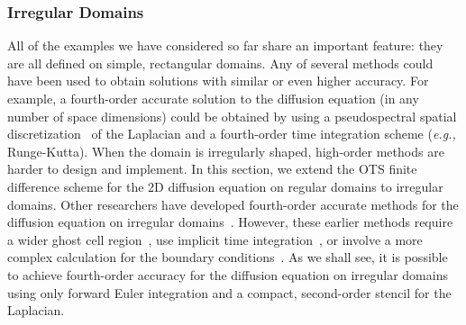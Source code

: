 \documentclass[fleqn,12pt,twoside]{article}
\def\eg{\emph{e.g., }}
\begin{document}
\subsubsection{Irregular Domains}
All of the examples we have considered so far share an important feature: they 
are all defined on simple, rectangular domains.  Any of several methods 
could have been used to obtain solutions with similar or even higher accuracy.
For example, a fourth-order accurate solution to the diffusion equation
(in any number of space dimensions) could be obtained by using a 
pseudospectral spatial 
discretization~\cite{trefethen_spectral_book,boyd_spectral_book} 
of the Laplacian and a fourth-order time integration scheme 
(\eg Runge-Kutta).  When the domain is irregularly shaped, high-order methods 
are harder to design and implement.  
In this section, we extend the OTS finite difference scheme for the 2D 
diffusion equation on regular domains to irregular domains.  Other 
researchers have developed fourth-order accurate methods for the diffusion 
equation on irregular domains~\cite{gibou_2005,ito_2005}.  However, these 
earlier methods require a wider ghost cell region~\cite{gibou_2005}, use
implicit time integration~\cite{gibou_2005,ito_2005}, or involve a more 
complex calculation for the boundary conditions~\cite{ito_2005}.  As we shall 
see, it is possible to achieve fourth-order accuracy for the diffusion 
equation on irregular domains using only forward Euler integration and a 
compact, second-order stencil for the Laplacian.
\end{document}
